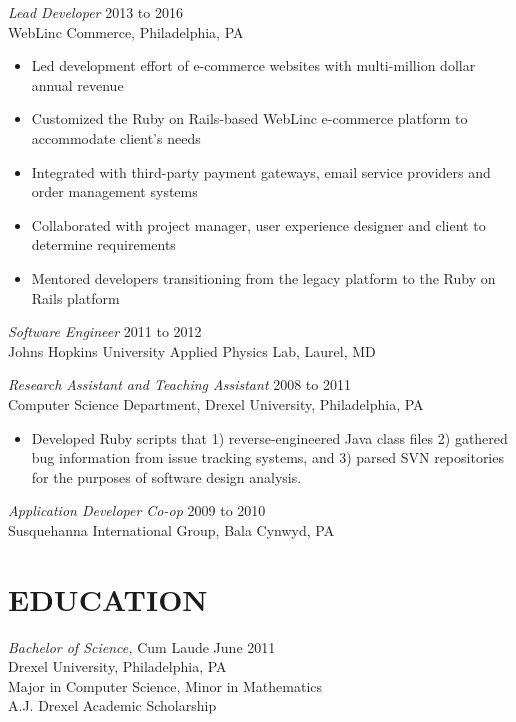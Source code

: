 \documentclass[line]{style}
\begin{document}
\begin{resume}
{\sl Lead Developer} \hfill 2013 to 2016 \\
WebLinc Commerce, Philadelphia, PA
\begin{itemize} \itemsep -2pt
\item Led development effort of e-commerce websites with multi-million dollar annual revenue
\item Customized the Ruby on Rails-based WebLinc e-commerce platform to accommodate client's needs
\item Integrated with third-party payment gateways, email service providers and order management systems
\item Collaborated with project manager, user experience designer and client to determine requirements
\item Mentored developers transitioning from the legacy platform to the Ruby on Rails platform
\end{itemize}

{\sl Software Engineer} \hfill 2011 to 2012 \\
Johns Hopkins University Applied Physics Lab, Laurel, MD

{\sl Research Assistant and Teaching Assistant} \hfill 2008 to 2011 \\
Computer Science Department, Drexel University, Philadelphia, PA
\begin{itemize}  \itemsep -2pt
\item Developed Ruby scripts that 1) reverse-engineered Java class files 2) gathered bug information from issue tracking systems, and 3) parsed SVN repositories for the purposes of software design analysis.
\end{itemize}

{\sl Application Developer Co-op} \hfill        2009 to 2010 \\
Susquehanna International Group, Bala Cynwyd, PA

\section{EDUCATION}
{\sl Bachelor of Science,} Cum Laude \hfill June 2011 \\
Drexel University, Philadelphia, PA \\
Major in Computer Science, Minor in Mathematics \\
A.J. Drexel Academic Scholarship

\end{resume}
\end{document}
